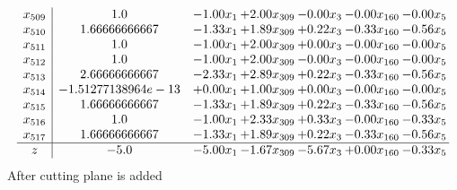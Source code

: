 \documentclass[8pt]{article}
\begin{document}
\[\begin{array}{c| c c@{\hskip 2pt} c@{\hskip 2pt} c@{\hskip 2pt} c@{\hskip 2pt} c@{\hskip 2pt} }
 x_{509}   &  1.0 & -1.00 x_{1} & +  2.00 x_{309} & -0.00 x_{3} & -0.00 x_{160} & -0.00 x_{5}\\
 x_{510}   &  1.66666666667 & -1.33 x_{1} & +  1.89 x_{309} & +  0.22 x_{3} & -0.33 x_{160} & -0.56 x_{5}\\
 x_{511}   &  1.0 & -1.00 x_{1} & +  2.00 x_{309} & +  0.00 x_{3} & -0.00 x_{160} & -0.00 x_{5}\\
 x_{512}   &  1.0 & -1.00 x_{1} & +  2.00 x_{309} & -0.00 x_{3} & -0.00 x_{160} & -0.00 x_{5}\\
 x_{513}   &  2.66666666667 & -2.33 x_{1} & +  2.89 x_{309} & +  0.22 x_{3} & -0.33 x_{160} & -0.56 x_{5}\\
 x_{514}   &  -1.51277138964e-13 & +  0.00 x_{1} & +  1.00 x_{309} & +  0.00 x_{3} & -0.00 x_{160} & -0.00 x_{5}\\
 x_{515}   &  1.66666666667 & -1.33 x_{1} & +  1.89 x_{309} & +  0.22 x_{3} & -0.33 x_{160} & -0.56 x_{5}\\
 x_{516}   &  1.0 & -1.00 x_{1} & +  2.33 x_{309} & +  0.33 x_{3} & -0.00 x_{160} & -0.33 x_{5}\\
 x_{517}   &  1.66666666667 & -1.33 x_{1} & +  1.89 x_{309} & +  0.22 x_{3} & -0.33 x_{160} & -0.56 x_{5}\\
\hline
z    &  -5.0 & -5.00 x_{1} & -1.67 x_{309} & -5.67 x_{3} & +  0.00 x_{160} & -0.33 x_{5}\\
\end{array}\]
 After cutting plane is added 
\end{document}
